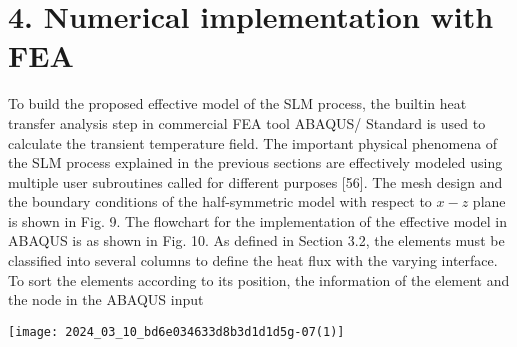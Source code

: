 \documentclass[10pt]{article}
\begin{document}
\section*{4. Numerical implementation with FEA}
To build the proposed effective model of the SLM process, the builtin heat transfer analysis step in commercial FEA tool ABAQUS/ Standard is used to calculate the transient temperature field. The important physical phenomena of the SLM process explained in the previous sections are effectively modeled using multiple user subroutines called for different purposes [56]. The mesh design and the boundary conditions of the half-symmetric model with respect to $x-z$ plane is shown in Fig. 9. The flowchart for the implementation of the effective model in ABAQUS is as shown in Fig. 10. As defined in Section 3.2, the elements must be classified into several columns to define the heat flux with the varying interface. To sort the elements according to its position, the information of the element and the node in the ABAQUS input

\begin{center}
\texttt{[image: 2024\_03\_10\_bd6e034633d8b3d1d1d5g-07(1)]}
\end{center}
\end{document}
